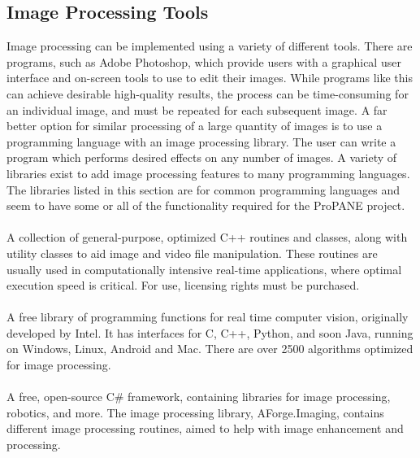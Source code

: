 \documentclass{article}
\begin{document}
\subsection*{Image Processing Tools}

Image processing can be implemented using a variety of different tools.  There are programs, such as Adobe Photoshop, which provide users with a graphical user interface and on-screen tools to use to edit their images.  While programs like this can achieve desirable high-quality results, the process can be time-consuming for an individual image, and must be repeated for each subsequent image.  A far better option for similar processing of a large quantity of images is to use a programming language with an image processing library.  The user can write a program which performs desired effects on any number of images.  A variety of libraries exist to add image processing features to many programming languages.  The libraries listed in this section are for common programming languages and seem to have some or all of the functionality required for the ProPANE project.  \\ 

 \cite{eutecus} \\

\noindent A collection of general-purpose, optimized C++ routines and classes, along with utility classes to aid image and video file manipulation.  These routines are usually used in computationally intensive real-time applications, where optimal execution speed is critical.  For use, licensing rights must be purchased. \\

 \cite{opencv} \\

\noindent A free library of programming functions for real time computer vision, originally developed by Intel.  It has interfaces for C, C++, Python, and soon Java, running on Windows, Linux, Android and Mac.  There are over 2500 algorithms optimized for image processing.  \\

 \cite{aforge1} \\

\noindent A free, open-source C\# framework, containing libraries for image processing, robotics, and more.  The image processing library, AForge.Imaging, contains different image processing routines, aimed to help with image enhancement and processing.  \\
\end{document}
